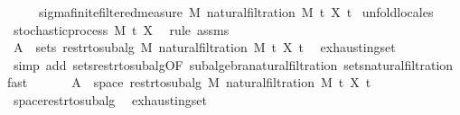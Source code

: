 \begin{isabellebody}
\ \ \ \ \ {\isachardoublequoteopen}sigma{\isacharunderscore}{\kern0pt}finite{\isacharunderscore}{\kern0pt}filtered{\isacharunderscore}{\kern0pt}measure\ M\ {\isacharparenleft}{\kern0pt}natural{\isacharunderscore}{\kern0pt}filtration\ M\ t\ X{\isacharparenright}{\kern0pt}\ t\isanewline
%
\isadelimproof
%
\endisadelimproof
%
\isatagproof
{}\isamarkupfalse%
\ {\isacharparenleft}{\kern0pt}unfold{\isacharunderscore}{\kern0pt}locales{\isacharparenright}{\kern0pt}\isanewline
\ \ \isamarkupfalse%
\ stochastic{\isacharunderscore}{\kern0pt}process\ M\ t\ X\ \isamarkupfalse%
\ {\isacharparenleft}{\kern0pt}rule\ assms{\isacharparenright}{\kern0pt}\isanewline
\ \ \isamarkupfalse%
\ {\isachardoublequoteopen}A\ {\isasymsubseteq}\ sets\ {\isacharparenleft}{\kern0pt}restr{\isacharunderscore}{\kern0pt}to{\isacharunderscore}{\kern0pt}subalg\ M\ {\isacharparenleft}{\kern0pt}natural{\isacharunderscore}{\kern0pt}filtration\ M\ t\ X\ t\ \isamarkupfalse%
\ exhausting{\isacharunderscore}{\kern0pt}set\ \isamarkupfalse%
\ {\isacharparenleft}{\kern0pt}simp\ add{\isacharcolon}{\kern0pt}\ sets{\isacharunderscore}{\kern0pt}restr{\isacharunderscore}{\kern0pt}to{\isacharunderscore}{\kern0pt}subalg{\isacharbrackleft}{\kern0pt}OF\ subalgebra{\isacharunderscore}{\kern0pt}natural{\isacharunderscore}{\kern0pt}filtration{\isacharbrackright}{\kern0pt}\ sets{\isacharunderscore}{\kern0pt}natural{\isacharunderscore}{\kern0pt}filtration{\isacharprime}{\kern0pt}{\isacharparenright}{\kern0pt}\ fast\isanewline
\ \ \isamarkupfalse%
\ \isamarkupfalse%
\ {\isachardoublequoteopen}{\isasymUnion}\ A\ {\isacharequal}{\kern0pt}\ space\ {\isacharparenleft}{\kern0pt}restr{\isacharunderscore}{\kern0pt}to{\isacharunderscore}{\kern0pt}subalg\ M\ {\isacharparenleft}{\kern0pt}natural{\isacharunderscore}{\kern0pt}filtration\ M\ t\ X\ t\ \isamarkupfalse%
\ space{\isacharunderscore}{\kern0pt}restr{\isacharunderscore}{\kern0pt}to{\isacharunderscore}{\kern0pt}subalg\ \isamarkupfalse%
\ exhausting{\isacharunderscore}{\kern0pt}set\ \isamarkupfalse%

\end{isabellebody}

